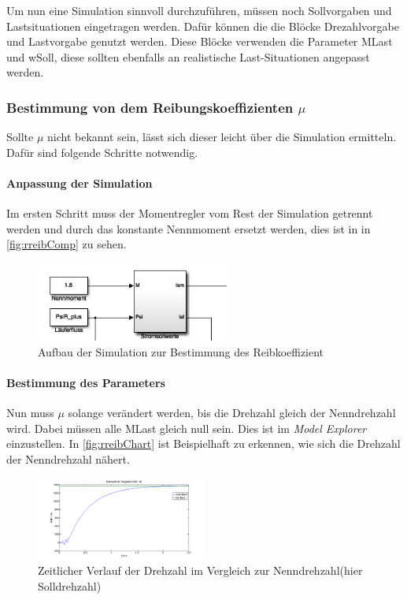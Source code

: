 Um nun eine Simulation sinnvoll durchzuführen, müssen noch Sollvorgaben und Lastsituationen eingetragen werden. Dafür können die die Blöcke Drezahlvorgabe und Lastvorgabe genutzt werden. Diese Blöcke verwenden die Parameter MLast und wSoll, diese sollten ebenfalls an realistische Last-Situationen angepasst werden.\\\par

\subsubsection{Bestimmung von dem Reibungskoeffizienten $\mu$}
Sollte $\mu$  nicht bekannt sein, lässt sich dieser leicht über die Simulation ermitteln. Dafür sind folgende Schritte notwendig.
\paragraph{Anpassung der Simulation}
	Im ersten Schritt muss der Momentregler vom Rest der Simulation getrennt werden und durch das konstante Nennmoment ersetzt werden, dies ist in in \autoref{fig:rreibComp} zu sehen.
	\begin{figure}[H]
		\includegraphics[width=2.5in]{pictures/Reibkoeffizient_bestimmen}
		\caption{Aufbau der Simulation zur Bestimmung des Reibkoeffizient}
		\label{fig:rreibComp}
	\end{figure}
\paragraph{Bestimmung des Parameters}\label{par:mu0BestimmungParameter}
	Nun muss \begin{math}\mu\end{math} solange verändert werden, bis die Drehzahl gleich der Nenndrehzahl wird. Dabei müssen alle MLast gleich null sein. Dies ist im \textit{Model Explorer} einzustellen. In \autoref{fig:rreibChart} ist Beispielhaft zu erkennen, wie sich die Drehzahl der Nenndrehzahl nähert. 
	\begin{figure}[H]
		\includegraphics[width=0.5\textwidth]{pictures/Reibkoeffizient_Chart.png}
		\caption{Zeitlicher Verlauf der Drehzahl im Vergleich zur Nenndrehzahl(hier Solldrehzahl)}
		\label{fig:rreibChart}
	\end{figure}	
	
